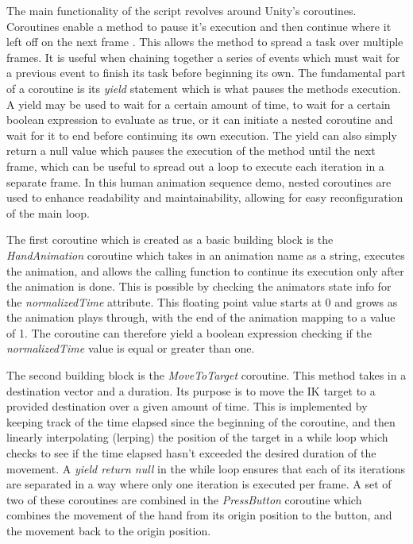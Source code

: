 The main functionality of the script revolves around Unity's coroutines.
Coroutines enable a method to pause it's execution and then continue where it
left off on the next frame \cite{unity_coroutines}. This allows the method to
spread a task over multiple frames. It is useful when chaining together a series
of events which must wait for a previous event to finish its task before
beginning its own. The fundamental part of a coroutine is its \textit{yield}
statement which is what pauses the methods execution. A yield may be used to
wait for a certain amount of time, to wait for a certain boolean expression to
evaluate as true, or it can initiate a nested coroutine and wait for it to end
before continuing its own execution. The yield can also simply return a null
value which pauses the execution of the method until the next frame, which can
be useful to spread out a loop to execute each iteration in a separate frame. In
this human animation sequence demo, nested coroutines are used to enhance
readability and maintainability, allowing for easy reconfiguration of the main
loop. 

The first coroutine which is created as a basic building block is the
\textit{HandAnimation} coroutine which takes in an animation name as a string,
executes the animation, and allows the calling function to continue its
execution only after the animation is done. This is possible by checking the
animators state info for the \textit{normalizedTime} attribute. This floating
point value starts at 0 and grows as the animation plays through, with the end
of the animation mapping to a value of 1. The coroutine can therefore yield
a boolean expression checking if the \textit{normalizedTime} value is equal or
greater than one. 

The second building block is the \textit{MoveToTarget} coroutine. This method
takes in a destination vector and a duration. Its purpose is to move the IK
target to a provided destination over a given amount of time. This is
implemented by keeping track of the time elapsed since the beginning of the
coroutine, and then linearly interpolating (lerping) the position of the target
in a while loop which checks to see if the time elapsed hasn't exceeded the
desired duration of the movement. A \textit{yield return null} in the while loop
ensures that each of its iterations are separated in a way where only one
iteration is executed per frame. A set of two of these coroutines are combined
in the \textit{PressButton} coroutine which combines the movement of the hand
from its origin position to the button, and the movement back to the origin
position.

